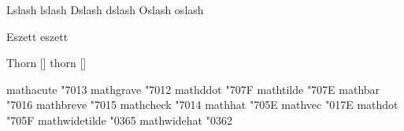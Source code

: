  Lslash  {\Lstroke}
 lslash  {\lstroke}
 Dslash  {\Lstroke}
 dslash  {\lstroke}
 Oslash  {\Lstroke}
 oslash  {\lstroke}

 Eszett  {\Ssharp}
 eszett  {\ssharp}

 Thorn {[]}
 thorn {[]}

\stopencoding


\startencoding[default]

 mathacute      "7013 
 mathgrave      "7012 
 mathddot       "707F 
 mathtilde      "707E 
 mathbar        "7016 
 mathbreve      "7015 
 mathcheck      "7014 
 mathhat        "705E 
 mathvec        "017E 
 mathdot        "705F 
 mathwidetilde  "0365 
 mathwidehat    "0362 

\stopencoding

\endinput
